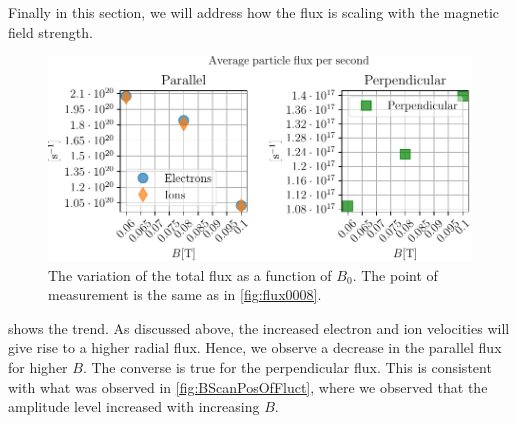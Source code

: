 Finally in this section, we will address how the flux is scaling with the magnetic field strength.
%
\begin{figure}[htb]
    \centering
    \includegraphics{fig/results/bScan/BScanTotalFlux}
    \caption{
        The variation of the total flux as a function of $B_0$.
        The point of measurement is the same as in \cref{fig:flux0008}.
    }
    \label{fig:BScanTotalFlux}
\end{figure}
%
 shows the trend.
As discussed above, the increased electron and ion velocities will give rise to a higher radial flux.
Hence, we observe a decrease in the parallel flux for higher $B$.
The converse is true for the perpendicular flux.
This is consistent with what was observed in \cref{fig:BScanPosOfFluct}, where we observed that the amplitude level increased with increasing $B$.

